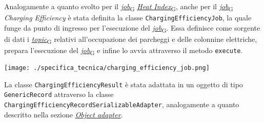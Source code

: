 Analogamente a quanto svolto per il \href{https://7last.github.io/docs/pb/documentazione-interna/glossario\#job}{\textit{job}\textsubscript{G}} \href{https://7last.github.io/docs/pb/documentazione-interna/glossario\#heat-index}{\textit{Heat Index}\textsubscript{G}}, anche per il \href{https://7last.github.io/docs/pb/documentazione-interna/glossario\#job}{\textit{job}\textsubscript{G}} \textit{Charging Efficiency} è stata definita la
classe \texttt{ChargingEfficiencyJob}, la quale funge da punto di ingresso per l'esecuzione del \href{https://7last.github.io/docs/pb/documentazione-interna/glossario\#job}{\textit{job}\textsubscript{G}}. Essa definisce come sorgente di dati
i \href{https://7last.github.io/docs/pb/documentazione-interna/glossario\#topic}{\textit{topic}\textsubscript{G}} relativi all'occupazione dei parcheggi e delle colonnine elettriche, prepara l'esecuzione del \href{https://7last.github.io/docs/pb/documentazione-interna/glossario\#job}{\textit{job}\textsubscript{G}} e infine lo avvia
attraverso il metodo \texttt{execute}.\\

\begin{center}
	\texttt{[image: ./specifica\_tecnica/charging\_efficiency\_job.png]}
\end{center}

La classe \texttt{ChargingEfficiencyResult} è stata adattata in un oggetto di tipo \texttt{GenericRecord} attraverso la classe \texttt{ChargingEfficiencyRecordSerializableAdapter},
analogamente a quanto descritto nella sezione \hyperref[object_adapter]{\underline{\textit{Object adapter}}}.

